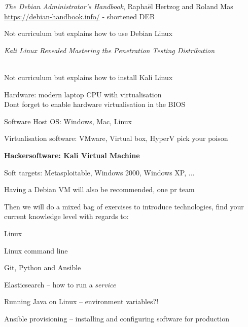 \documentclass[Screen16to9,17pt]{foils}
\begin{document}

\emph{The Debian Administrator’s Handbook}, Raphaël Hertzog and Roland Mas\\
\url{https://debian-handbook.info/} - shortened DEB

Not curriculum but explains how to use Debian Linux



\emph{Kali Linux Revealed  Mastering the Penetration Testing Distribution}

\\
Not curriculum but explains how to install Kali Linux









\begin{list2}
\item Hardware: modern laptop CPU with virtualisation\\
Dont forget to enable hardware virtualisation in the BIOS
\item Software Host OS: Windows, Mac, Linux
\item Virtualisation software: VMware, Virtual box, HyperV pick your poison
\item {\bf Hackersoftware: Kali Virtual Machine }
\item Soft targets: Metasploitable, Windows 2000, Windows XP, ...
\end{list2}

\centerline{Having a Debian VM will also be recommended, one pr team}



Then we will do a mixed bag of exercises to introduce technologies, find your current knowledge level with regards to:

\begin{list2}
\item Linux
\item Linux command line
\item Git, Python and Ansible
\item Elasticsearch -- how to run a \emph{service}
\item Running Java on Linux -- environment variables?!
\item Ansible provisioning -- installing and configuring software for production
\end{list2}
\end{document}

